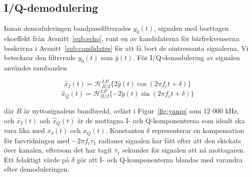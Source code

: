 \documentclass[10pt,twocolumn]{article}
\begin{document}
% 

\subsection{I/Q-demodulering\label{sub:iq}}
Innan demoduleringen bandpassfiltrerades $y_0(t)$, signalen med borttagen
ekoeffekt från Avsnitt~\ref{sub:echo}, runt en av kandidaterna
för bärfrekvenserna beskrivna i Avsnitt~\ref{sub:candidates} för att få bort de
ointressanta signalerna. Vi betecknar den filtrerade $y_0(t)$ som $\hat{y}(t)$.
För I/Q-demodulering av signalen användes sambanden

\begin{equation*}
    \hat{x}_I(t) = \mathcal{H}_{B/2}^{LP}\{2\hat{y}(t)\cos(2\pi f_c t + \delta)\}
\end{equation*}
\begin{equation*}
    \hat{x}_Q(t) = \mathcal{H}_{B/2}^{LP}\{-2\hat{y}(t)\sin(2\pi f_c t + \delta)\}
\end{equation*}

där $B$ är nyttosignalens bandbredd, avläst i Figur~\ref{fig:yamp} som 12 000
kHz, och
$\hat{x}_I(t)$ och $\hat{x}_Q(t)$ är de mottagna I- och Q-komponenterna som
idealt ska vara lika med $x_I(t)$ och $x_Q(t)$.
Konstanten $\delta$ representerar en kompensation för fasvridningen med 
$-2\pi f_c \tau_1$ radianer signalen har fått efter
att den skickats över kanalen, eftersom det har tagit $\tau_1$ sekunder för
signalen att nå mottagaren. Ett felaktigt värde på $\delta$ gör att
I- och Q-komponenterna blandas med varandra efter demoduleringen.
\end{document}
